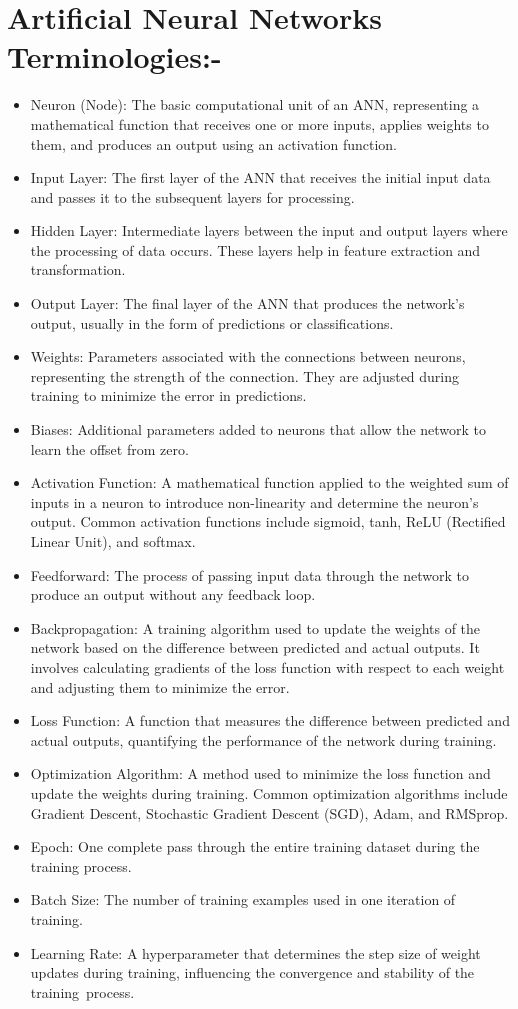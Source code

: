 \documentclass[12pt,a4paper]{report}
\begin{document}
\section*{Artificial Neural Networks Terminologies:-}
\begin{itemize}
\item Neuron (Node): The basic computational unit of an ANN, representing a mathematical function that receives one or more inputs, applies weights to them, and produces an output using an activation function.
\item Input Layer: The first layer of the ANN that receives the initial input data and passes it to the subsequent layers for processing.
\item Hidden Layer: Intermediate layers between the input and output layers where the processing of data occurs. These layers help in feature extraction and transformation.
\item Output Layer: The final layer of the ANN that produces the network's output, usually in the form of predictions or classifications.
\item Weights: Parameters associated with the connections between neurons, representing the strength of the connection. They are adjusted during training to minimize the error in predictions.
\item Biases: Additional parameters added to neurons that allow the network to learn the offset from zero.
\item Activation Function: A mathematical function applied to the weighted sum of inputs in a neuron to introduce non-linearity and determine the neuron's output. Common activation functions include sigmoid, tanh, ReLU (Rectified Linear Unit), and softmax.
\item Feedforward: The process of passing input data through the network to produce an output without any feedback loop.
\item Backpropagation: A training algorithm used to update the weights of the network based on the difference between predicted and actual outputs. It involves calculating gradients of the loss function with respect to each weight and adjusting them to minimize the error.
\item Loss Function: A function that measures the difference between predicted and actual outputs, quantifying the performance of the network during training.
\item Optimization Algorithm: A method used to minimize the loss function and update the weights during training. Common optimization algorithms include Gradient Descent, Stochastic Gradient Descent (SGD), Adam, and RMSprop.
\item Epoch: One complete pass through the entire training dataset during the training process.
\item Batch Size: The number of training examples used in one iteration of training.
\item Learning Rate: A hyperparameter that determines the step size of weight updates during training, influencing the convergence and stability of the training process.
\end{itemize}
\newpage
\end{document}
